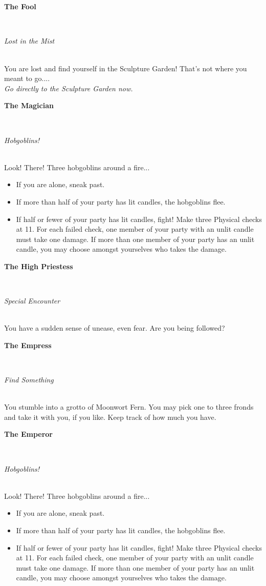 \documentclass[green]{gl2018}
\begin{document}
\name{\gFog{}}
\newcommand{\areastart}[2]{ \begin{huge}{\bf {#1}} \end{huge} \\ \begin{large} \emph{#2} \end{large}\\}
\newcommand{\hobgoblins}[3]{Look!  There!  #1 hobgoblins around a fire...  

\begin{itemize}
\item If you are alone, sneak past.
\item If more than half of your party has lit candles, the hobgoblins flee.
\item If half or fewer of your party has lit candles, fight!  Make #2 Physical checks at #3.  For each failed check, one member of your party with an unlit candle must take one damage.  If more than one member of your party has an unlit candle, you may choose amongst yourselves who takes the damage.
\end{itemize}}
\newenvironment{location}[2]{\begin{minipage}{\textwidth}\areastart{#1}{#2}}{\end{minipage}\vspace{0.3in}}
\newcommand{\lost}[1]{You are lost and find yourself in #1!  That's not where you meant to go....\\{\em Go directly to #1 now.}}
\begin{location}{\hspace{0.5in}}{ }
\end{location}
\begin{location}{The Fool}{Lost in the Mist}
\lost{the Sculpture Garden}
\end{location}
\begin{location}{The Magician}{Hobgoblins!}
\hobgoblins{Three}{three}{11}
\end{location}
\begin{location}{The High Priestess}{Special Encounter}
You have a sudden sense of unease, even fear.  Are you being followed?
\end{location}
\begin{location}{The Empress}{Find Something}
You stumble into a grotto of Moonwort Fern.  You may pick one to three fronds and take it with you, if you like.  Keep track of how much you have.
\end{location}
\begin{location}{The Emperor}{Hobgoblins!}
\hobgoblins{Three}{three}{11}
\end{location}
\end{document}
